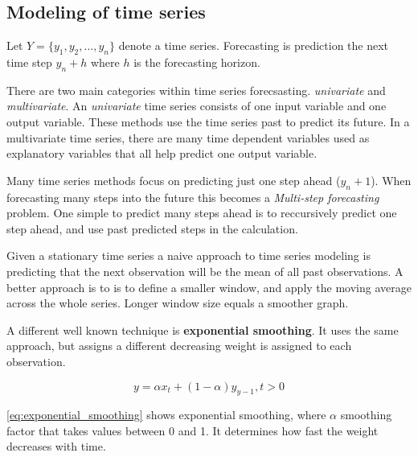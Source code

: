 \subsection{Modeling of time series}
Let  $Y = \{y_1, y_2, ..., y_n\}$ denote a time series.
Forecasting is prediction the next time step $y_n+h$ where $h$ is the forecasting horizon.

There are two main categories within time series forecsasting. \textit{univariate} and \textit{multivariate}. 
An \textit{univariate} time series consists of one input variable and one output variable. These methods use the time series past to predict its future.
In a multivariate time series, there are many time dependent variables used as explanatory variables that all help predict one output variable.


Many time series methods focus on predicting just one step ahead ($y_n+1$). When forecasting many steps into the future this becomes a 
\textit{Multi-step forecasting} problem. One simple to predict many steps ahead is to reccursively predict one step ahead, and use past predicted steps 
in the calculation.


Given a stationary time series a naive approach to time series modeling is predicting that the next observation will be the
mean of all past observations. A better approach is to is to define a smaller window, and
apply the moving average across the whole series. Longer window size equals a smoother graph.

A different well known technique is \textbf{exponential smoothing}. It uses the same approach,
but assigns a different decreasing weight is assigned to each observation.

\begin{equation}
    \label{eq:exponential_smoothing}
    y = \alpha x_t + (1 - \alpha)y_{y-1}, t > 0
\end{equation}

\autoref{eq:exponential_smoothing}
shows exponential smoothing, where $\alpha$ smoothing factor
that takes values between 0 and 1. It determines how fast the weight decreases with time.

